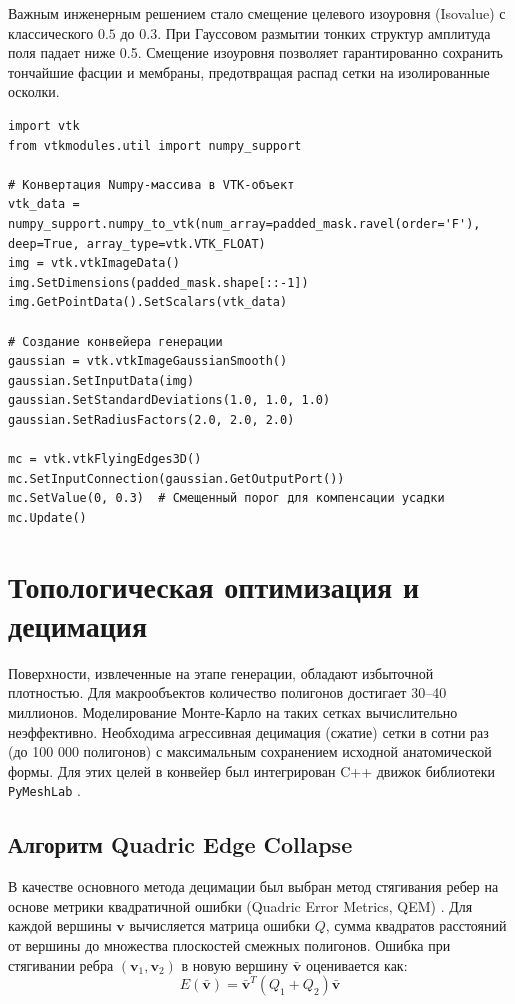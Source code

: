 \documentclass[a4paper,14pt]{article}
\begin{document}
Важным инженерным решением стало смещение целевого изоуровня (Isovalue) с классического $0.5$ до $0.3$. При Гауссовом размытии тонких структур амплитуда поля падает ниже 0.5. Смещение изоуровня позволяет гарантированно сохранить тончайшие фасции и мембраны, предотвращая распад сетки на изолированные осколки.

\begin{lstlisting}[caption={Интеграция \texttt{vtkFlyingEdges3D} и Гауссова фильтра}]
import vtk
from vtkmodules.util import numpy_support

# Конвертация Numpy-массива в VTK-объект
vtk_data = numpy_support.numpy_to_vtk(num_array=padded_mask.ravel(order='F'), deep=True, array_type=vtk.VTK_FLOAT)
img = vtk.vtkImageData()
img.SetDimensions(padded_mask.shape[::-1])
img.GetPointData().SetScalars(vtk_data)

# Создание конвейера генерации
gaussian = vtk.vtkImageGaussianSmooth()
gaussian.SetInputData(img)
gaussian.SetStandardDeviations(1.0, 1.0, 1.0)
gaussian.SetRadiusFactors(2.0, 2.0, 2.0)

mc = vtk.vtkFlyingEdges3D()
mc.SetInputConnection(gaussian.GetOutputPort())
mc.SetValue(0, 0.3)  # Смещенный порог для компенсации усадки
mc.Update()
\end{lstlisting}

\newpage
\section{Топологическая оптимизация и децимация}

Поверхности, извлеченные на этапе генерации, обладают избыточной плотностью. Для макрообъектов количество полигонов достигает 30--40 миллионов. Моделирование Монте-Карло на таких сетках вычислительно неэффективно. Необходима агрессивная децимация (сжатие) сетки в сотни раз (до 100 000 полигонов) с максимальным сохранением исходной анатомической формы. Для этих целей в конвейер был интегрирован C++ движок библиотеки \texttt{PyMeshLab} \cite{pymeshlab}.

\subsection{Алгоритм Quadric Edge Collapse}
В качестве основного метода децимации был выбран метод стягивания ребер на основе метрики квадратичной ошибки (Quadric Error Metrics, QEM) \cite{garland1997}. Для каждой вершины $\mathbf{v}$ вычисляется матрица ошибки $Q$, сумма квадратов расстояний от вершины до множества плоскостей смежных полигонов. Ошибка при стягивании ребра $(\mathbf{v}_1, \mathbf{v}_2)$ в новую вершину $\mathbf{\bar{v}}$ оценивается как:
\begin{equation}
    E(\mathbf{\bar{v}}) = \mathbf{\bar{v}}^T (Q_1 + Q_2) \mathbf{\bar{v}}
\end{equation}
\end{document}
